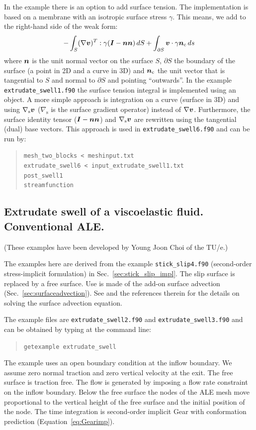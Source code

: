 In the example there is an option to add surface tension. The implementation is
based on a membrane with an isotropic surface stress $\gamma$. This means,
we add to the right-hand side of the weak form:
\begin{equation}
  -\int_S(\nabla\boldsymbol{v})^T:\gamma(\boldsymbol{I}-\boldsymbol{n}\boldsymbol{n})\,dS+
\int_{\partial S}\boldsymbol{v}\cdot\gamma\boldsymbol{n}_\text{c}\,ds
\end{equation}
where $\boldsymbol{n}$ is the unit normal vector on the surface $S$, $\partial S$ the
boundary of the surface (a point in 2D and a curve in 3D) and
$\boldsymbol{n}_\text{c}$ the
unit vector that is tangential to $S$ and normal to $\partial S$ and pointing
``outwards''. In the example \texttt{extrudate\_swell1.f90} the surface tension
integral is implemented using an object. A more simple approach is integration
on a curve (surface in 3D) and using $\nabla_\text{s}\boldsymbol{v}$ ($\nabla_\text{s}$
is the surface gradient operator) instead of $\nabla\boldsymbol{v}$. Furthermore, the
surface identity tensor ($\boldsymbol{I}-\boldsymbol{n}\boldsymbol{n}$) and $\nabla_\text{s}\boldsymbol{v}$ are
rewritten using the tangential (dual) base vectors. This approach is
used in \texttt{extrudate\_swell6.f90} and can be run by:
\begin{quote}
   \texttt{mesh\_two\_blocks < meshinput.txt}\\
   \texttt{extrudate\_swell6 < input\_extrudate\_swell1.txt}\\
   \texttt{post\_swell1}\\
   \texttt{streamfunction}
\end{quote}

\subsection{Extrudate swell of a viscoelastic fluid. Conventional ALE.}
\label{sec:swellviscoelastic}

(These examples have been developed by Young Joon Choi of the TU/e.)

The examples here are derived from the example \texttt{stick\_slip4.f90}
(second-order stress-implicit formulation) in Sec.~\ref{sec:stick_slip_impl}.
The slip surface is replaced by a free surface.
Use is made of the add-on surface advection (Sec.~\ref{sec:surfaceadvection}).
See \cite{Choi11c,Choi11b} and the references therein for the details on
solving the surface advection equation.

The example files are \texttt{extrudate\_swell2.f90} and
\texttt{extrudate\_swell3.f90} and can
be obtained by typing at the
command line:
\begin{quote}
   \texttt{getexample extrudate\_swell}
\end{quote}
The example uses an open boundary condition at the inflow boundary.
We assume zero normal traction and zero vertical velocity at the exit.
The free surface is traction free.
The flow is generated by imposing a flow rate constraint on the inflow
boundary.
Below the free surface the nodes of the ALE mesh move proportional to the
vertical height of the free surface and the initial position of the
node.
The time integration is second-order implicit Gear with conformation prediction
(Equation~\eqref{eq:Gearimp}).

